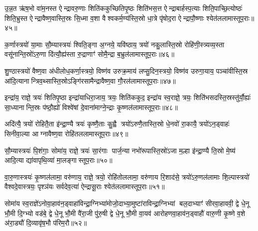 {\anuvakamend[{॥13॥}]}

उ॒न्न॒त ऋ॑ष॒भो वा॑म॒नस्त ऐन्द्रावरु॒णाः शिति॑ककुच्छितिपृ॒ष्ठः शिति॑भस॒त्त ऐन्द्राबार्\mbox{}हस्प॒त्याः शिति॒पाच्छि॒त्योष्ठः॑ शिति॒भ्रुस्त ऐन्द्रावैष्ण॒वास्ति॒स्रः सि॒ध्मा व॒शा वैश्वकर्म॒ण्य॑स्ति॒स्रो धा॒त्रे पृ॑षोद॒रा ऐन्द्रापौ॒ष्णाः श्येत॑ललामास्तूप॒राः॥४५॥

{\anuvakamend[{शि॒ति॒बा॒हुरु॑न्न॒तः पञ्च॑विशतिः॒ पञ्च॑विशतिः॥14॥}]}

क॒र्णास्त्रयो॑ या॒माः सौ॒म्यास्त्रयः॑ श्विति॒ङ्गा अ॒ग्नये॒ यवि॑ष्ठाय॒ त्रयो॑ नकु॒लास्ति॒स्रो रोहि॑णी॒स्त्र्यव्य॒स्ता वसू॑नान्ति॒स्रो॑ऽरु॒णा दि॑त्यौ॒ह्य॑स्ता रु॒द्राणाꣳ॑ सोमै॒न्द्रा ब॒भ्रुल॑लामास्तूप॒राः॥४६॥

{\anuvakamend[{क॒र्णास्त्रयो॑विशतिः॥15॥}]}

शु॒ण्ठास्त्रयो॑ वैष्ण॒वा अ॑धीलोध॒कर्णा॒स्त्रयो॒ विष्ण॑व उरुक्र॒माय॑ लप्सु॒दिन॒स्त्रयो॒ विष्ण॑व उरुगा॒याय॒ पञ्चा॑वीस्ति॒स्र आ॑दि॒त्यानान्त्रिव॒थ्सास्ति॒स्रोऽङ्गि॑रसामैन्द्रावैष्ण॒वा गौ॒रल॑लामास्तूप॒राः॥४७॥

{\anuvakamend[{शु॒ण्ठा विꣳ॑श॒तिः॥16॥}]}

इन्द्रा॑य॒ राज्ञे॒ त्रयः॑ शितिपृ॒ष्ठा इन्द्रा॑याधिरा॒जाय॒ त्रयः॒ शिति॑ककुद॒ इन्द्रा॑य स्व॒राज्ञे॒ त्रयः॒ शिति॑भसदस्ति॒स्रस्तु॑र्यौ॒ह्यः॑ सा॒ध्यानान्ति॒स्रः प॑ष्ठौ॒ह्यो॑ विश्वे॑षां दे॒वाना॑माग्ने॒न्द्राः कृ॒ष्णल॑लामास्तूप॒राः॥४८॥

{\anuvakamend[{इन्द्रा॑य॒ राज्ञे॒ द्वाविꣳ॑शतिः॥17॥}]}

अदि॑त्यै॒ त्रयो॑ रोहितै॒ता इ॑न्द्रा॒ण्यै त्रयः॑ कृष्णै॒ताः कु॒ह्वै त्रयो॑ऽरुणै॒तास्ति॒स्रो धे॒नवो॑ रा॒कायै॒ त्रयो॑ऽन॒ड्वाहः॑ सिनीवा॒ल्या आग्नावैष्ण॒वा रोहि॑तललामास्तूप॒राः॥४९॥

{\anuvakamend[{अदि॑त्या अ॒ष्टाद॑श॥18॥}]}

सौ॒म्यास्त्रयः॑ पि॒शंगाः॒ सोमा॑य॒ राज्ञे॒ त्रयः॑ सा॒रंगाः पार्ज॒न्या नभो॑रूपास्ति॒स्रो॑ऽजा म॒ल्\mbox{}हा इ॑न्द्रा॒ण्यै ति॒स्रो मे॒ष्य॑ आदि॒त्या द्या॑वापृथि॒व्या॑ मा॒लङ्गास्तूप॒राः॥५०॥

{\anuvakamend[{सौ॒म्या एका॒न्नविꣳ॑शतिः॥19॥}]}

वा॒रु॒णास्त्रयः॑ कृ॒ष्णल॑लामा॒ वरु॑णाय॒ राज्ञे॒ त्रयो॒ रोहि॑तोललामा॒ वरु॑णाय रि॒शाद॑से॒ त्रयो॑ऽरु॒णल॑लामाः शि॒ल्पास्त्रयो॑ वैश्वदे॒वास्त्रयः॒ पृश्ञ॑यः सर्वदेव॒त्या॑ ऐन्द्रासू॒राः श्येत॑ललामास्तूप॒राः॥५१॥

{\anuvakamend[{वा॒रु॒णा विꣳ॑श॒तिः॥20॥}]}

सोमा॑य स्व॒राज्ञे॑ऽनोवा॒हाव॑न॒ड्वाहा॑विन्द्रा॒ग्निभ्या॑मोजो॒दाभ्या॒मुष्टा॑राविन्द्रा॒ग्निभ्यां बल॒दाभ्याꣳ॑ सीरवा॒हाववी॒ द्वे धे॒नू भौ॒मी दि॒ग्भ्यो वड॑बे॒ द्वे धे॒नू भौ॒मी वै॑रा॒जी पु॑रु॒षी द्वे धे॒नू भौ॒मी वा॒यव॑ आरोहणवा॒हाव॑न॒ड्वाहौ॑ वारु॒णी कृ॒ष्णे व॒शे अ॑रा॒ड्यौ॑ दि॒व्यावृ॑ष॒भौ प॑रिम॒रौ॥५२॥

